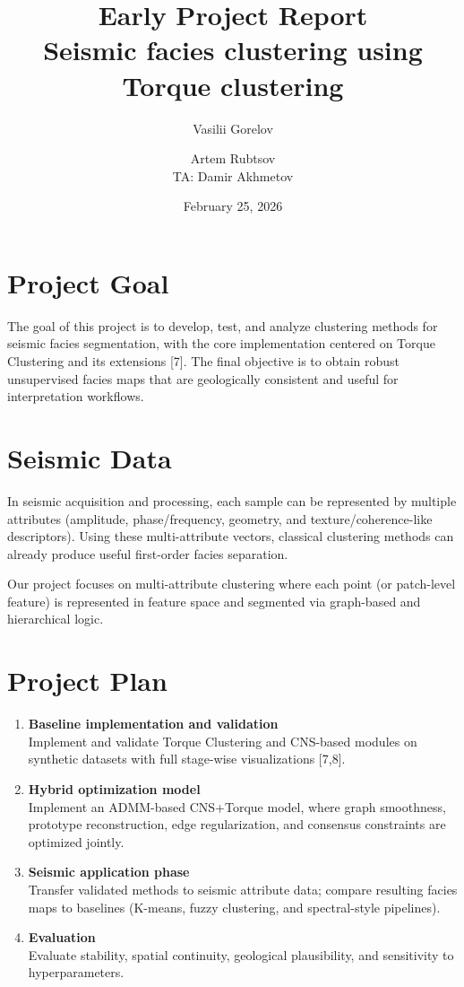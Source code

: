\documentclass[11pt,a4paper]{article}
\title{Early Project Report\\\large Seismic facies clustering using Torque clustering}
\author{Vasilii Gorelov \and Artem Rubtsov\\[0.5em]\hspace*{-4.5cm}TA: Damir Akhmetov}
\date{February 25, 2026}
\begin{document}
\maketitle
\onehalfspacing
 

\section*{Project Goal}
The goal of this project is to develop, test, and analyze clustering methods for seismic facies segmentation, with the core implementation centered on Torque Clustering and its extensions [7]. The final objective is to obtain robust unsupervised facies maps that are geologically consistent and useful for interpretation workflows.

\section*{Seismic Data}
In seismic acquisition and processing, each sample can be represented by multiple attributes (amplitude, phase/frequency, geometry, and texture/coherence-like descriptors). Using these multi-attribute vectors, classical clustering methods can already produce useful first-order facies separation.

Our project focuses on multi-attribute clustering where each point (or patch-level feature) is represented in feature space and segmented via graph-based and hierarchical logic.

\section*{Project Plan}
\begin{enumerate}[leftmargin=1.5em]
    \item \textbf{Baseline implementation and validation}\\
    Implement and validate Torque Clustering and CNS-based modules on synthetic datasets with full stage-wise visualizations [7,8].

    \item \textbf{Hybrid optimization model}\\
    Implement an ADMM-based CNS+Torque model, where graph smoothness, prototype reconstruction, edge regularization, and consensus constraints are optimized jointly.

    \item \textbf{Seismic application phase}\\
    Transfer validated methods to seismic attribute data; compare resulting facies maps to baselines (K-means, fuzzy clustering, and spectral-style pipelines).

    \item \textbf{Evaluation}\\
    Evaluate stability, spatial continuity, geological plausibility, and sensitivity to hyperparameters.
\end{enumerate}
\end{document}

